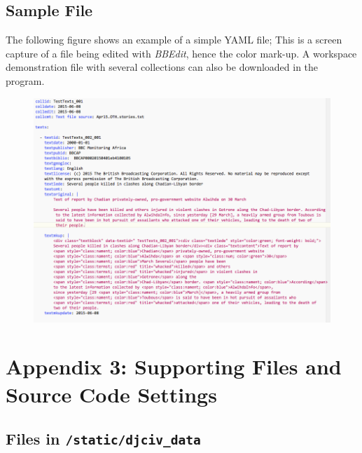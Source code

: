 \documentclass[letterpaper,10pt,english]{sphinxmanual}
\begin{document}
\section{Sample File}
\label{appendix2:sample-file}
The following figure shows an example of a simple YAML file; This is a screen capture of a file being edited with \emph{BBEdit},
hence the color mark-up. A workspace demonstration file with several collections can also be downloaded in the program.
\begin{figure}[htbp]
\centering

\includegraphics{yamlexample.png}
\end{figure}


\chapter{Appendix 3: Supporting Files and Source Code Settings}
\label{appendix3:appendix-3-supporting-files-and-source-code-settings}\label{appendix3::doc}

\section{Files in \texttt{/static/djciv\_data}}
\label{appendix3:files-in-static-djciv-data}
\end{document}
